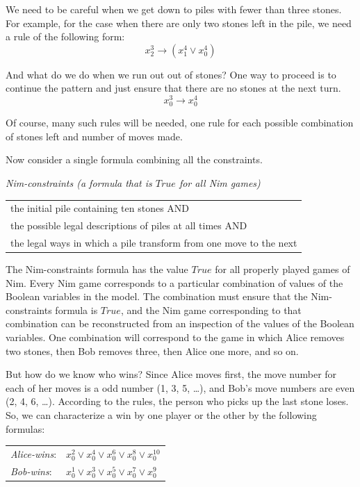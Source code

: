{{We need to be careful when we get down to piles with fewer than three stones.
For example, for the case when there are only
two stones left in the pile, we need a rule of the following form:
$$x_{2}^{3} \rightarrow (x_{1}^{4} \vee x_{0}^{4})$$

And what do we do when we run out out of stones?
One way to proceed is to continue the pattern
and just ensure that there are no stones at the next turn.
$$x_{0}^{3} \rightarrow x_{0}^{4}$$

Of course, many such rules will be needed,
one rule for each possible combination of stones left and number of moves made.

Now consider a single formula combining all the constraints.

\begin{center}
\emph{Nim-constraints (a formula that is $True$ for all Nim games)}
\begin{tabular}{l}
\hline
the initial pile containing ten stones AND\\
the possible legal descriptions of piles at all times AND\\
the legal ways in which a pile transform from one move to the next\\
\end{tabular}
\end{center}

The Nim-constraints formula has the value $True$ for all properly played games of Nim.
Every Nim game corresponds to a particular combination of values of
the Boolean variables in the model.
The combination must ensure that the Nim-constraints formula is $True$, and
the Nim game corresponding to that combination can be reconstructed
from an inspection of the values of the Boolean variables.
One combination will correspond to the game in which Alice removes two stones,
then Bob removes three, then Alice one more, and so on.

But how do we know who wins?
Since Alice moves first, the move number for each of her moves is a odd number (1, 3, 5, \dots),
and Bob's move numbers are even (2, 4, 6, \dots).
According to the rules, the person who picks up the last stone loses.
So, we can characterize a win by one player or the other by
the following formulas:
\begin{center}
\label{alice-wins-formula}
\begin{tabular} {ll}
\emph{Alice-wins}: & $x_{0}^{2} \vee x_{0}^{4} \vee x_{0}^{6} \vee x_{0}^{8} \vee x_{0}^{10}$ \\
\emph{Bob-wins}:   & $x_{0}^{1} \vee x_{0}^{3} \vee x_{0}^{5} \vee x_{0}^{7} \vee x_{0}^{9}$  \\
\end{tabular}
\end{center}

}}
